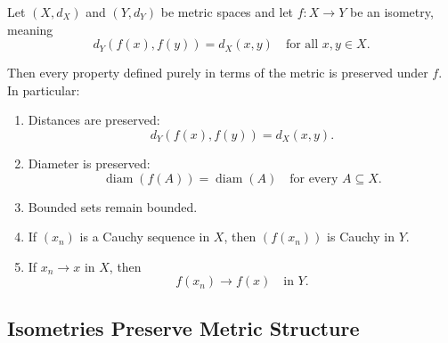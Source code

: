 
\begin{theorem}
Let $(X,d_X)$ and $(Y,d_Y)$ be metric spaces and let
$f:X\to Y$ be an isometry, meaning
\[
d_Y(f(x),f(y)) = d_X(x,y)
\quad
\text{for all } x,y\in X.
\]

Then every property defined purely in terms of the metric
is preserved under $f$. In particular:

\begin{enumerate}

\item Distances are preserved:
\[
d_Y(f(x),f(y)) = d_X(x,y).
\]

\item Diameter is preserved:
\[
\operatorname{diam}(f(A)) = \operatorname{diam}(A)
\quad
\text{for every } A\subseteq X.
\]

\item Bounded sets remain bounded.

\item If $(x_n)$ is a Cauchy sequence in $X$, then
$(f(x_n))$ is Cauchy in $Y$.

\item If $x_n \to x$ in $X$, then
\[
f(x_n) \to f(x)
\quad
\text{in } Y.
\]

\end{enumerate}

\end{theorem}



\subsection*{Isometries Preserve Metric Structure}

